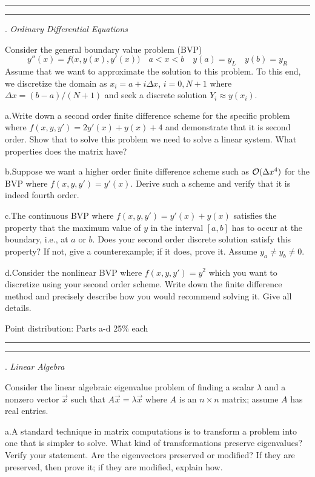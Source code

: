 \documentclass [11point]{article}
\begin{document}
\medskip
\hrule 

\pagebreak
\hrule 
{}. \textit{Ordinary Differential Equations}
\bigskip

Consider the general  boundary value problem (BVP) $$ y''(x) = f\big (x, y(x), y'(x) \big)\quad a < x < b \quad y(a)=y_L \quad y(b) = y_R $$ Assume that we want to approximate the solution to this problem.  To this end, we   discretize  the domain as $x_i=a+i \Delta x$, $i=0, N+1$ where $\Delta x = (b-a)/(N+1)$ and seek a discrete solution $Y_i  \approx y(x_i)$. \smallskip

a.\quad  Write down a second order finite difference scheme for the specific problem where $f(x,y,y')= 2y'(x)+y(x)+4$ and demonstrate that it is second order.   Show that to solve this problem we need to solve a linear system.  What properties does the matrix have? \medskip

b.\quad Suppose we want a higher order finite difference scheme such as ${\cal {O}}(\Delta x^4)$ for the  BVP  where
$f(x,y,y')=y'(x) $.  Derive such a scheme and verify that it is indeed fourth order.  \medskip

c.\quad  The continuous BVP where $f(x,y,y')= y'(x) +   y(x)  $ satisfies the property that the maximum value of $y$ in the interval $[a,b]$ has to occur at the boundary, i.e., at $a$ or $b$.  Does  your second order discrete solution  satisfy this property? If not, give a counterexample; if it does, prove it.  Assume $y_a \ne y_b \ne 0$.  \medskip 

d.\quad  Consider the nonlinear BVP where $f(x,y,y')=y^2$ which you want to discretize using your second order scheme. Write down the finite difference method and precisely describe how you would recommend solving it. Give all details.  \medskip

Point distribution:  Parts a-d 25\% each
\medskip
\hrule \medskip

\pagebreak
\hrule 
{}. \textit{Linear Algebra}
\bigskip

Consider the linear algebraic eigenvalue problem of finding a scalar $\lambda$ and a nonzero vector $\vec x$ such that $A\vec x = \lambda \vec x$ where $A$ is an $n \times n$ matrix; assume $A$ has real entries.  \smallskip

a.\quad  A standard technique in matrix computations is to transform a problem into one that is simpler to solve.  What kind of transformations preserve eigenvalues?  Verify your statement.   Are the eigenvectors preserved or modified?  If they are preserved, then prove it; if they are modified, explain how.  \medskip
\end{document}
